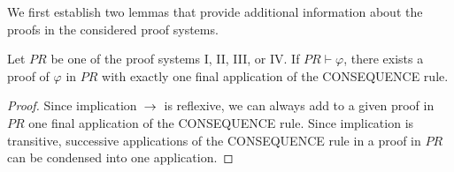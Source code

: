 \documentclass[manuscript, screen, review]{acmart}
\begin{document}

         
         
   
   



We first establish two lemmas that provide additional
information about the proofs in the considered proof systems.

\begin{lemma} \label{lemma:1}
Let $\mathit{PR}$ be one of the proof systems I, II, III, or IV.
If $\mathit{PR} \vdash \varphi$, there exists a proof of $\varphi$ in $\mathit{PR}$ 
with exactly one final application of the CONSEQUENCE rule.
\end{lemma}

\begin{proof}
Since implication $\mbox{$\:\rightarrow\:$}$ is reflexive, we can always add to a given proof in $\mathit{PR}$
one final application of the CONSEQUENCE rule.
Since implication is transitive, successive applications of the CONSEQUENCE rule in a proof in $\mathit{PR}$
can be condensed into one application.
\end{proof} 
\end{document}
